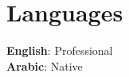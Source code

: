 \documentclass[letterpaper,11pt]{article}
\begin{document}


\section{Languages}
 \begin{itemize}[leftmargin=0.15in, label={}]
    \small{\item{
     \textbf{English}{: Professional} \\
     \textbf{Arabic}{: Native} \\
    }}
 \end{itemize}

\end{document}
